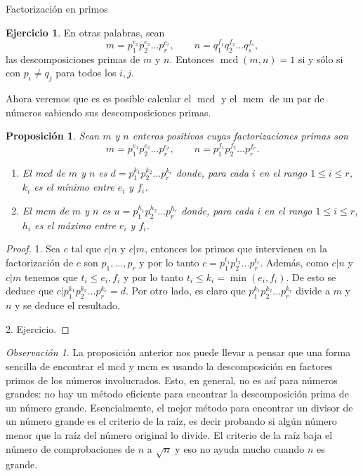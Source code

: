 \documentclass[11pt,spanish,makeidx]{amsbook}
\newtheorem{proposicion}[teorema]{Proposici\'on}
\theoremstyle{definition}
\newtheorem{ejercicio}{Ejercicio}[section]
\theoremstyle{remark}
\newtheorem{observacion}{Observaci\'on}[section]
\newcommand \mcd{\operatorname{mcd}}
\newcommand \mcm{\operatorname{mcm}}
\begin{document}
\begin{section}{Factorización en primos}
\begin{ejercicio}
En otras palabras, sean  
$$
m=p_1^{e_1}p_2^{e_2}\ldots p_r^{e_r},\qquad
n=q_1^{f_1}q_2^{f_2}\ldots q_s^{f_s},
$$ 
las descomposiciones primas de $m$ y $n$. Entonces  $\operatorname{mcd}(m,n) =1$ si y sólo si con $p_i \not= q_j$ para todos los $i,j$.  
\end{ejercicio}

Ahora veremos que es es posible calcular el $\mcd$ y el $\mcm$ de un par de números sabiendo sus descomposiciones primas.

\begin{proposicion}\label{prop-mcd}
Sean $m$ y $n$ enteros positivos cuyas factorizaciones primas son
$$
m=p_1^{e_1}p_2^{e_2}\ldots p_r^{e_r},\qquad
n=p_1^{f_1}p_2^{f_2}\ldots p_r^{f_r}.
$$
\begin{enumerate}
\item El mcd de $m$ y $n$ es $d=p_1^{k_1}p_2^{k_2}\ldots p_r^{k_r}$ donde, para cada $i$ en el rango $1\le i \le r$, $k_i$ es el mínimo entre $e_i$ y $f_i$.
\item El mcm de $m$ y $n$ es $u=p_1^{h_1}p_2^{h_2}\ldots p_r^{h_r}$ donde, para cada $i$ en el rango $1\le i \le r$, $h_i$ es el máximo entre $e_i$ y $f_i$.
\end{enumerate}
\end{proposicion}
\begin{proof} 1. Sea $c$ tal que $c|n$ y $c|m$, entonces los primos que intervienen en la factorización de $c$ son $p_1,\ldots,p_r$ y por lo tanto $c =  p_1^{t_1}p_2^{t_2}\ldots p_r^{t_r}$. Además, como $c|n$ y $c|m$ tenemos que $t_i \le e_i,f_i$ y por lo tanto $t_i \le k_i = \min(e_i,f_i)$. De esto se deduce que $c|p_1^{k_1}p_2^{k_2}\ldots p_r^{k_r}=d$. Por otro lado, es claro  que  $p_1^{k_1}p_2^{k_2}\ldots p_r^{k_r}$ divide a $m$ y $n$ y se deduce el resultado.

2. Ejercicio. 
\end{proof}

\begin{observacion} La proposición anterior nos puede llevar a pensar que una forma sencilla de encontrar el mcd y mcm  es usando la descomposición en factores primos de los números involucrados. Esto, en general, no es así para números grandes: no hay un método eficiente para encontrar la descomposición prima de un número grande. Esencialmente, el mejor método para encontrar un divisor de un número grande es el criterio de la raíz, es decir probando si algún número menor que la raíz del número original lo divide. El criterio de la raíz baja el número de comprobaciones de $n$ a $\sqrt{n}$ y eso no ayuda mucho cuando $n$ es grande.


\end{observacion}
\end{section}
\end{document}
